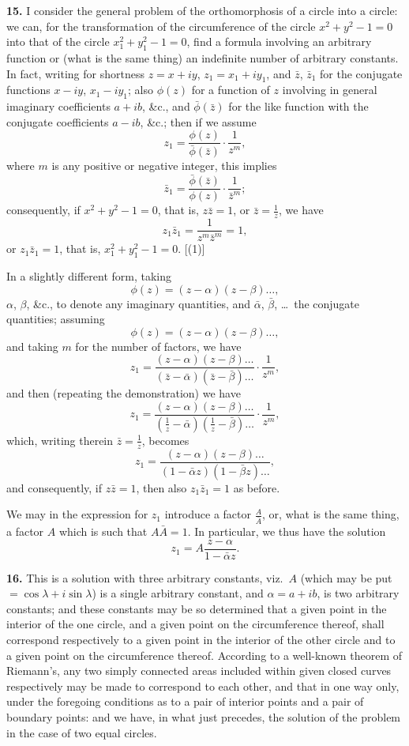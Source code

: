 \documentclass[11pt,a4paper]{book}
\begin{document}
{{{\textbf{15.} I consider the general problem of the orthomorphosis of a circle into a
circle: we can, for the transformation of the circumference of the circle $x^2 + y^2 - 1 = 0$
into that of the circle $x_1^2 + y_1^2 - 1 = 0$, find a formula involving an arbitrary function
or (what is the same thing) an indefinite number of arbitrary constants. In fact,
writing for shortness $z = x + iy$, $z_1 = x_1 + iy_1$, and $\bar{z}$, $\bar{z}_1$ for the conjugate functions
$x - iy$, $x_1 - iy_1$; also $\phi(z)$ for a function of $z$ involving in general imaginary coefficients
$a + ib$, \&c., and $\bar{\phi}(\bar{z})$ for the like function with the conjugate coefficients
$a - ib$, \&c.; then if we assume
\[
z_1 = \frac{\phi(z)}{\bar{\phi}(\bar{z})} \cdot \frac{1}{z^m},
\]
where $m$ is any positive or negative integer, this implies
\[
\bar{z}_1 = \frac{\bar{\phi}(\bar{z})}{\phi(z)} \cdot \frac{1}{\bar{z}^m};
\]
consequently, if $x^2 + y^2 - 1 = 0$, that is, $z\bar{z} = 1$, or $\bar{z} = \frac{1}{z}$, we have
\[
z_1\bar{z}_1 = \frac{1}{z^m\bar{z}^m} = 1,
\]
or $z_1\bar{z}_1 = 1$, that is, $x_1^2 + y_1^2 - 1 = 0$. \hfill [(1)]

In a slightly different form, taking
\[
\phi(z) = (z - \alpha)(z - \beta)\ldots,
\]
$\alpha$, $\beta$, \&c., to denote any imaginary quantities,
and $\bar{\alpha}$, $\bar{\beta}$, \ldots\ the conjugate quantities; assuming
\[
\phi(z) = (z - \alpha)(z - \beta) \ldots,
\]
and taking $m$ for the number of factors, we have
\[
z_1 = \frac{(z - \alpha)(z - \beta)\ldots}{(\bar{z} - \bar{\alpha})(\bar{z} - \bar{\beta})\ldots} \cdot \frac{1}{z^m},
\]
and then (repeating the demonstration) we have
\[
z_1 = \frac{(z - \alpha)(z - \beta)\ldots}{(\frac{1}{z} - \bar{\alpha})(\frac{1}{z} - \bar{\beta})\ldots} \cdot \frac{1}{z^m},
\]
which, writing therein $\bar{z} = \frac{1}{z}$, becomes
\[
z_1 = \frac{(z - \alpha)(z - \beta)\ldots}{(1 - \bar{\alpha}z)(1 - \bar{\beta}z)\ldots},
\]
and consequently, if $z\bar{z} = 1$, then also $z_1\bar{z}_1 = 1$ as before.

We may in the expression for $z_1$ introduce a factor $\frac{A}{\bar{A}}$, or, what is the same
thing, a factor $A$ which is such that $A\bar{A} = 1$. In particular, we thus have the solution
\[
z_1 = A\frac{z - \alpha}{1 - \bar{\alpha}z}.
\]

\newpage
\textbf{16.} This is a solution with three arbitrary constants, viz.~$A$ (which may be
put $= \cos\lambda + i\sin\lambda$) is a single arbitrary constant, and $\alpha = a + ib$, is two arbitrary
constants; and these constants may be so determined that a given point in the
interior of the one circle, and a given point on the circumference thereof, shall
correspond respectively to a given point in the interior of the other circle and to a
given point on the circumference thereof. According to a well-known theorem of
Riemann's, any two simply connected areas included within given closed curves
respectively may be made to correspond to each other, and that in one way only,
under the foregoing conditions as to a pair of interior points and a pair of boundary
points: and we have, in what just precedes, the solution of the problem in the case
of two equal circles.

}}}
\end{document}
